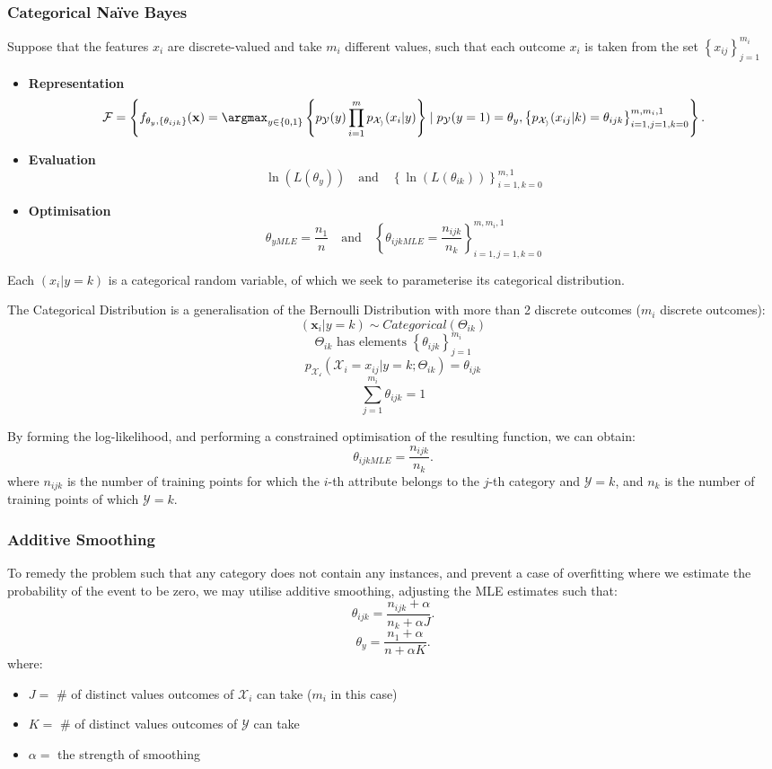 \subsubsection{Categorical Naïve Bayes}
Suppose that the features $x_i$ are discrete-valued and take $m_i$ different
values, such that each outcome $x_i$ is taken from the set ${\left\{ x_{ij}
\right\}}_{j=1}^{m_i}$
\begin{itemize}
  \item \textbf{Representation}
      \[\mathcal{F}=\left\{ f_{\theta_y,\left\{ \theta_{ijk} \right\}} (\mathbf{x})=\argmax_{y\in \left\{ 0,1 \right\}} \left\{ p_\mathcal{Y}(y)\prod_{i=1}^{m} p_\mathcal{X_i} (x_i|y) \right\} \mid p_\mathcal{Y}(y=1)=\theta_y,{\left\{ p_\mathcal{X_i}(x_{ij}|k)=\theta_{ijk} \right\}}^{m,m_i,1}_{i=1,j=1,k=0} \right\}.\] 
  \item \textbf{Evaluation}
    \[\ln\left( L(\theta_y) \right)\quad\text{and}\quad {\left\{ \ln\left( L\left( \theta_{ik} \right)  \right) \right\}}^{m,1}_{i=1,k=0}\] 
  \item \textbf{Optimisation}
    \[\theta_{yMLE}=\frac{n_1}{n}\quad\text{and}\quad {\left\{\theta_{ijkMLE}=\frac{n_{ijk}}{n_k}\right\}}^{m,m_i,1}_{i=1,j=1,k=0}\] 
\end{itemize}
Each $(x_i|y=k)$ is a categorical random variable, of which we seek to
parameterise its categorical distribution.
\begin{definition}
  The Categorical Distribution is a generalisation of the Bernoulli
  Distribution with more than 2 discrete outcomes ($m_i$ discrete outcomes):
  \[(\mathbf{x}_i|y=k)\sim Categorical(\Theta_{ik})\]
  \[\Theta_{ik}\text{ has elements }{\left\{ \theta_{ijk} \right\}}_{j=1}^{m_i}\]
  \[p_\mathcal{X_i}\left( \mathcal{X}_i=x_{ij}|y=k;\Theta_{ik} \right)=\theta_{ijk} \] 
  \[\sum_{j=1}^{m_i} \theta_{ijk}=1\]
\end{definition}
By forming the log-likelihood, and performing a constrained optimisation of the
resulting function, we can obtain:
\[\theta_{ijkMLE}=\frac{n_{ijk}}{n_k}.\]
where $n_{ijk}$ is the number of training points for which the $i$-th attribute
belongs to the $j$-th category and $\mathcal{Y}=k$, and $n_k$ is the number of
training points of which $\mathcal{Y}=k$.
\subsubsection{Additive Smoothing}
To remedy the problem such that any category does not contain any instances,
and prevent a case of overfitting where we estimate the probability of the
event to be zero, we may utilise additive smoothing, adjusting the MLE
estimates such that:
\[\theta_{ijk}=\frac{n_{ijk}+\alpha}{n_k+\alpha J}.\] 
\[\theta_y=\frac{n_1+\alpha}{n+\alpha K}.\]
where:
\begin{itemize}
  \item $J=$ \# of distinct values outcomes of $\mathcal{X}_i$ can take ($m_i$ in this case)
  \item $K=$ \# of distinct values outcomes of $\mathcal{Y}$ can take
  \item $\alpha=$ the strength of smoothing
\end{itemize}

